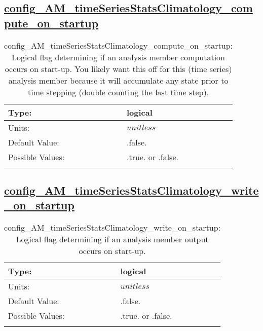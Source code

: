 \subsection[config\_AM\_timeSeriesStatsClimatology\_compute\_on\_startup]{\hyperref[sec:nm_tab_AM_timeSeriesStatsClimatology]{config\_AM\_timeSeriesStatsClimatology\_compute\_on\_startup}}
\label{subsec:nm_sec_config_AM_timeSeriesStatsClimatology_compute_on_startup}
\begin{center}
\begin{longtable}{| p{2.0in} || p{4.0in} |}
    \hline
    Type: & logical \\
    \hline
    Units: & $unitless$ \\
    \hline
    Default Value: & .false. \\
    \hline
    Possible Values: & .true. or .false. \\
    \hline
    \caption{config\_AM\_timeSeriesStatsClimatology\_compute\_on\_startup: Logical flag determining if an analysis member computation occurs on start-up. You likely want this off for this (time series) analysis member because it will accumulate any state prior to time stepping (double counting the last time step).}
\end{longtable}
\end{center}
\subsection[config\_AM\_timeSeriesStatsClimatology\_write\_on\_startup]{\hyperref[sec:nm_tab_AM_timeSeriesStatsClimatology]{config\_AM\_timeSeriesStatsClimatology\_write\_on\_startup}}
\label{subsec:nm_sec_config_AM_timeSeriesStatsClimatology_write_on_startup}
\begin{center}
\begin{longtable}{| p{2.0in} || p{4.0in} |}
    \hline
    Type: & logical \\
    \hline
    Units: & $unitless$ \\
    \hline
    Default Value: & .false. \\
    \hline
    Possible Values: & .true. or .false. \\
    \hline
    \caption{config\_AM\_timeSeriesStatsClimatology\_write\_on\_startup: Logical flag determining if an analysis member output occurs on start-up.}
\end{longtable}
\end{center}
